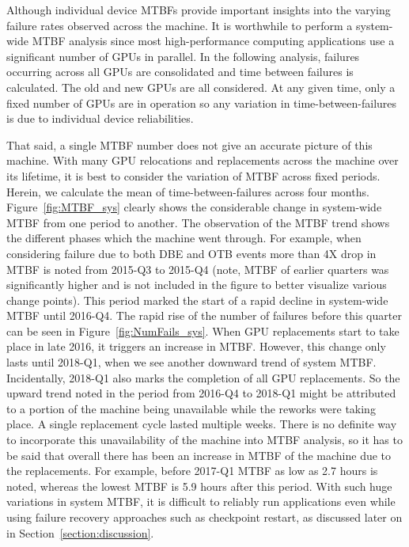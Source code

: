 Although individual device MTBFs provide important insights into the varying failure rates
observed across the machine. It is worthwhile to perform a system-wide MTBF analysis since 
most high-performance computing applications use a significant number of GPUs in parallel. 
In the following analysis, failures occurring across all GPUs are consolidated and time between failures
is calculated. The old and new GPUs are all considered. At any given time, only a fixed number of GPUs
are in operation so any variation in time-between-failures is due to individual device reliabilities.

That said, a single MTBF number does not give an accurate picture of this machine.
With many GPU relocations and replacements across the machine over its lifetime, it is 
best to consider the variation of MTBF across fixed periods. Herein, we calculate 
the mean of time-between-failures across four months. Figure~\ref{fig:MTBF_sys}
clearly shows the considerable change in system-wide MTBF from one period to another. 
The observation of the MTBF trend shows the different phases which the machine went through. 
For example, when considering failure due to both DBE and OTB events more than 4X drop in MTBF is 
noted from 2015-Q3 to 2015-Q4 (note, MTBF of earlier quarters was significantly higher and is not 
included in the figure to better visualize various change points). This period marked the start of 
a rapid decline in system-wide MTBF until 2016-Q4. The rapid rise of the number of failures before this 
quarter can be seen in Figure~\ref{fig:NumFails_sys}. When GPU replacements start to take place in late 
2016, it triggers an increase in MTBF. However, this change only lasts until 2018-Q1, when we see another 
downward trend of system MTBF. Incidentally, 2018-Q1 also marks the completion of all GPU replacements. 
So the upward trend noted in the period from 2016-Q4 to 2018-Q1 might be attributed to a portion of the machine 
being unavailable while the reworks were taking place. A single replacement cycle lasted multiple weeks. 
There is no definite way to incorporate this unavailability of the machine into MTBF analysis, so it has to
be said that overall there has been an increase in MTBF of the machine due to the replacements. 
For example, before 2017-Q1 MTBF as low as 2.7 hours is noted, whereas the lowest MTBF is 5.9 hours after this 
period. With such huge variations in system MTBF, it is difficult to reliably run applications even while using 
failure recovery approaches such as checkpoint restart, as discussed later on in Section~\ref{section:discussion}. 

